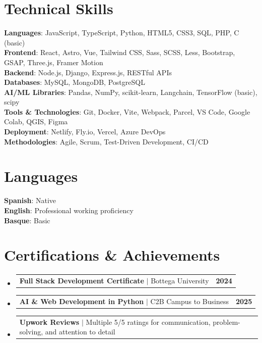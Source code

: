\documentclass[letterpaper,11pt]{article}
\makeatletter
\newcommand{\resumeProjectHeading}[2]{
    \item
    \begin{tabular*}{1.001\textwidth}{l@{\extracolsep{\fill}}r}
      \small#1 & \textbf{\small #2}\\
    \end{tabular*}\vspace{-7pt}
}
\newcommand{\resumeSubHeadingListStart}{\begin{itemize}[leftmargin=0.0in, label={}]}
\newcommand{\resumeSubHeadingListEnd}{\end{itemize}}
\makeatother
\begin{document}
\section{Technical Skills}
 \begin{itemize}[leftmargin=0.15in, label={}]
    \small{\item{
     \textbf{Languages}{: JavaScript, TypeScript, Python, HTML5, CSS3, SQL, PHP, C (basic)} \\
     \textbf{Frontend}{: React, Astro, Vue, Tailwind CSS, Sass, SCSS, Less, Bootstrap, GSAP, Three.js, Framer Motion} \\
     \textbf{Backend}{: Node.js, Django, Express.js, RESTful APIs} \\
     \textbf{Databases}{: MySQL, MongoDB, PostgreSQL} \\
     \textbf{AI/ML Libraries}{: Pandas, NumPy, scikit-learn, Langchain, TensorFlow (basic), scipy} \\
     \textbf{Tools \& Technologies}{: Git, Docker, Vite, Webpack, Parcel, VS Code, Google Colab, QGIS, Figma} \\
     \textbf{Deployment}{: Netlify, Fly.io, Vercel, Azure DevOps} \\
     \textbf{Methodologies}{: Agile, Scrum, Test-Driven Development, CI/CD}
    }}
 \end{itemize}
 \vspace{-16pt}

\section{Languages}
 \begin{itemize}[leftmargin=0.15in, label={}]
    \small{\item{
     \textbf{Spanish}{: Native} \\
     \textbf{English}{: Professional working proficiency} \\
     \textbf{Basque}{: Basic}
    }}
 \end{itemize}
 \vspace{-16pt}

\section{Certifications \& Achievements}
    \resumeSubHeadingListStart
      \resumeProjectHeading
          {\textbf{Full Stack Development Certificate} $|$ Bottega University}{2024}
      \resumeProjectHeading
          {\textbf{AI \& Web Development in Python} $|$ C2B Campus to Business}{2025}
      \resumeProjectHeading
          {\textbf{Upwork Reviews} $|$ Multiple 5/5 ratings for communication, problem-solving, and attention to detail}{}
    \resumeSubHeadingListEnd
\end{document}
